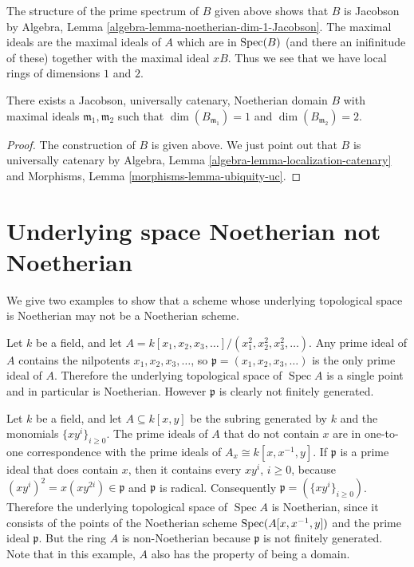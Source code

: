 \medskip\noindent
The structure of the prime spectrum of $B$ given above
shows that $B$ is Jacobson by
Algebra, Lemma \ref{algebra-lemma-noetherian-dim-1-Jacobson}.
The maximal ideals are the maximal ideals of $A$
which are in $\mathop{\mathrm{Spec}}(B)$ (and there an inifinitude of these)
together with the maximal ideal $xB$. Thus we see that we have
local rings of dimensions $1$ and $2$.

\begin{lemma}
\label{lemma-Noetherian-Jacobson}
There exists a Jacobson, universally catenary, Noetherian domain $B$
with maximal ideals $\mathfrak m_1, \mathfrak m_2$ such that
$\dim(B_{\mathfrak m_1}) = 1$ and $\dim(B_{\mathfrak m_2}) = 2$.
\end{lemma}

\begin{proof}
The construction of $B$ is given above. We just point out that
$B$ is universally catenary by
Algebra, Lemma \ref{algebra-lemma-localization-catenary} and
Morphisms, Lemma \ref{morphisms-lemma-ubiquity-uc}.
\end{proof}




\section{Underlying space Noetherian not Noetherian}
\label{section-noetherian-not-noetherian}

\noindent
We give two examples to show that a scheme whose underlying topological space
is Noetherian may not be a Noetherian scheme.

\begin{example}
\label{example-many-variables}
Let $k$ be a field, and let $A = k[x_1, x_2, x_3, \dots] /
(x_1^2, x_2^2, x_3^2, \dots)$.  Any prime ideal of $A$ contains the
nilpotents $x_1, x_2, x_3, \dots$, so $\mathfrak p = (x_1, x_2, x_3,
\dots)$ is the only prime ideal of $A$.  Therefore the underlying
topological space of $\operatorname{Spec} A$ is a single point and in
particular is Noetherian.  However $\mathfrak p$ is clearly not finitely
generated.
\end{example}

\begin{example}
\label{example-many-mononials}
Let $k$ be a field, and let $A \subseteq k[x, y]$ be the
subring generated by $k$ and the monomials $\{xy^i\}_{i \ge 0}$.  The prime
ideals of $A$ that do not contain $x$ are in one-to-one correspondence with
the prime ideals of $A_x \cong k[x, x^{-1}, y]$.  If $\mathfrak p$ is a
prime ideal that does contain $x$, then it contains every $xy^i$, $i \ge 0$,
because $(xy^i)^2 = x(xy^{2i}) \in \mathfrak p$ and $\mathfrak p$ is
radical.  Consequently $\mathfrak p = (\{xy^i\}_{i \ge 0})$.  Therefore the
underlying topological space of $\operatorname{Spec} A$ is Noetherian, since
it consists of the points of the Noetherian scheme
$\mathop{\mathrm{Spec}}(A[x, x^{-1}, y])$ and the prime ideal $\mathfrak p$.
But the ring $A$ is non-Noetherian because $\mathfrak p$
is not finitely generated.  Note that
in this example, $A$ also has the property of being a domain.
\end{example}






